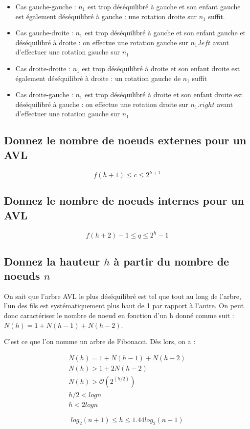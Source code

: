 \documentclass[11pt]{article}
\begin{document}
\begin{itemize}
	\item Cas gauche-gauche : $n_1$ est trop déséquilibré à gauche et son enfant gauche est également déséquilibré à gauche : une rotation droite sur $n_1$ suffit.
	\item Cas gauche-droite : $n_1$ est trop déséquilibré à gauche et son enfant gauche et déséquilibré à droite : on effectue une rotation gauche sur $n_1.left$ avant d'effectuer une rotation gauche sur $n_1$
	\item Cas droite-droite : $n_1$ est trop déséquilibré à droite et son enfant droite est également déséquilibré à droite : un rotation gauche de $n_1$ suffit
	\item Cas droite-gauche : $n_1$ est trop déséquilibré à droite et son enfant droite est déséquilibré à gauche : on effectue une rotation droite sur $n_1.right$ avant d'effectuer une rotation gauche sur $n_1$
\end{itemize}

\subsection{Donnez le nombre de noeuds externes pour un AVL}

\begin{equation}
	f(h + 1) \leq c \leq 2^{h+1}
\end{equation}

\subsection{Donnez le nombre de noeuds internes pour un AVL}

\begin{equation}
	f(h + 2) - 1 \leq q \leq 2^h - 1  
\end{equation}

\subsection{Donnez la hauteur $h$ à partir du nombre de noeuds $n$}

On sait que l'arbre AVL le plus déséquilibré est tel que tout au long de l'arbre, l'un des fils est systématiquement plus haut de 1 par rapport à l'autre. On peut donc caractériser le nombre de noeud en fonction d'un h donné comme suit : $N(h) = 1 + N(h-1) + N(h-2)$.

C'est ce que l'on nomme un arbre de Fibonacci.
Dès lors, on a : 

\begin{equation}
	\begin{split}
		N(h) = 1 +N(h-1) + N(h-2)\\
		N(h) > 1 + 2N(h-2)\\
		N(h) > \mathcal{O}(2^{(h/2)})\\
		h/2 < log n\\
		h < 2 log n
	\end{split}
\end{equation}

\begin{equation}
	log_2{(n + 1)} \leq h \leq 1.44 log_2{(n + 1)}
\end{equation}
\end{document}
